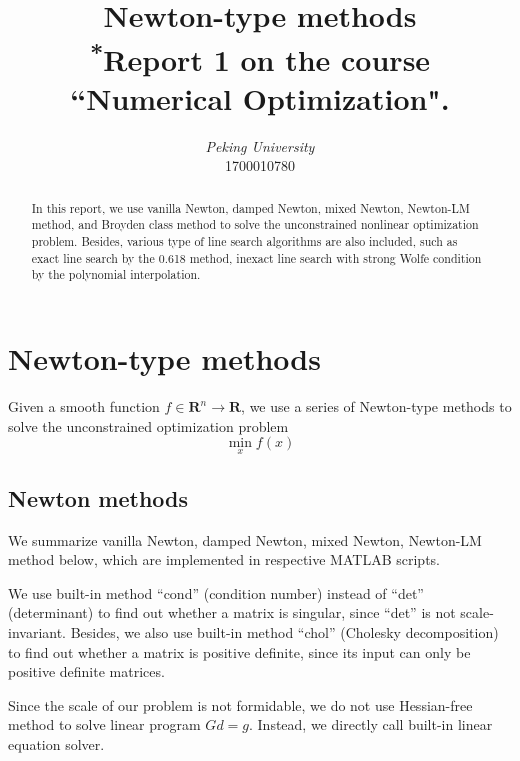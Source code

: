 \documentclass[conference]{IEEEtran}
\begin{document}
\title{Newton-type methods\\
{\footnotesize \textsuperscript{*}Report 1 on the course ``Numerical Optimization".}
}

\author{
\textit{Peking University}\\
1700010780}

\maketitle

\begin{abstract}
    In this report, we use vanilla Newton, damped Newton, mixed Newton, Newton-LM method, and Broyden class method to solve the unconstrained nonlinear optimization problem. Besides, various type of line search algorithms are also included, such as exact line search by the 0.618 method, inexact line search with strong Wolfe condition by the polynomial interpolation.
\end{abstract}
\section{Newton-type methods}
Given a smooth function $f\in \mathbf{R}^n\to\mathbf{R}$, we use a series of Newton-type methods to solve the
unconstrained optimization problem
\begin{equation}
    \min_x f(x)
\end{equation}
\subsection{Newton methods}
We summarize vanilla Newton, damped Newton, mixed Newton, Newton-LM method below, which are implemented in respective MATLAB scripts.

We use built-in method ``cond'' (condition number) instead of ``det'' (determinant) to find out whether a matrix is singular, since ``det'' is not scale-invariant. Besides, we also use built-in method ``chol'' (Cholesky decomposition) to find out whether a matrix is positive definite, since its input can only be positive definite matrices. 

Since the scale of our problem is not formidable, we do not use Hessian-free method to solve linear program $Gd = g$. Instead, we directly call built-in linear equation solver.
\end{document}
